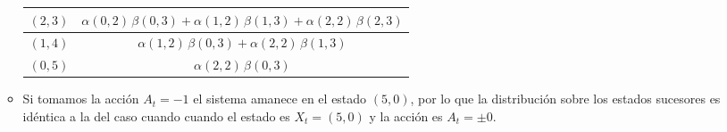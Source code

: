 \documentclass[ a4paper, twoside, 11pt]{article}
\begin{document}
\begin{problem}
\begin{itemize}
\begin{itemize}
\begin{table}[H]
\begin{tabular}{|c|c|}
$(2,3)$ & $\alpha(0,2) \, \beta(0,3) + \alpha(1,2) \, \beta(1,3) + \alpha(2,2) \, \beta(2,3)$ \\ \hline
$(1,4)$ & $\alpha(1,2) \, \beta(0,3) + \alpha(2,2) \, \beta(1,3)$ \\ \hline
$(0,5)$ & $\alpha(2,2) \, \beta(0,3)$ \\ \hline
\end{tabular}
\end{table}
\item Si tomamos la acci\'on $A_t = -1$ el sistema amanece en el estado $(5,0)$, por lo que la distribuci\'on sobre los estados sucesores es id\'entica a la del caso cuando cuando el estado es $X_t = (5,0)$ y la acci\'on es $A_t = \pm 0$. 
\end{itemize}

\end{itemize}

\end{problem}
\fullskip
\end{document}
